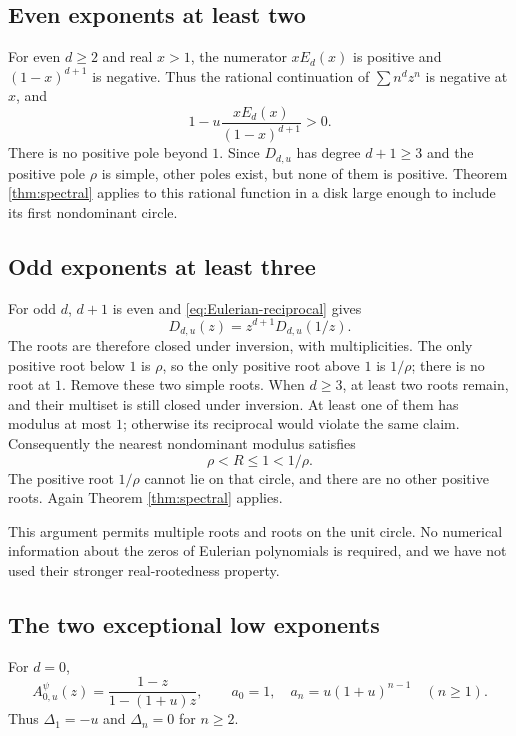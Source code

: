 \documentclass[11pt,letterpaper]{article}
\theoremstyle{definition}
\newcommand{\Delt}{\Delta}
\numberwithin{equation}{section}
\begin{document}
\subsection{Even exponents at least two}

For even $d\ge2$ and real $x>1$, the numerator $xE_d(x)$ is positive
and $(1-x)^{d+1}$ is negative. Thus the rational continuation of
$\sum n^d z^n$ is negative at $x$, and
\[
1-u\frac{xE_d(x)}{(1-x)^{d+1}}>0.
\]
There is no positive pole beyond $1$. Since $D_{d,u}$ has degree
$d+1\ge3$ and the positive pole $\rho$ is simple, other poles exist,
but none of them is positive. Theorem \ref{thm:spectral} applies to this
rational function in a disk large enough to include its first
nondominant circle.

\subsection{Odd exponents at least three}

For odd $d$, $d+1$ is even and \eqref{eq:Eulerian-reciprocal} gives
\begin{equation}\label{eq:D-reciprocal}
D_{d,u}(z)=z^{d+1}D_{d,u}(1/z).
\end{equation}
The roots are therefore closed under inversion, with multiplicities.
The only positive root below $1$ is $\rho$, so the only positive root
above $1$ is $1/\rho$; there is no root at $1$.
Remove these two simple roots. When $d\ge3$, at least two roots remain,
and their multiset is still closed under inversion. At least one of them
has modulus at most $1$; otherwise its reciprocal would violate the same
claim. Consequently the nearest nondominant modulus satisfies
\[
\rho<R\le1<1/\rho.
\]
The positive root $1/\rho$ cannot lie on that circle, and there are no
other positive roots. Again Theorem \ref{thm:spectral} applies.

This argument permits multiple roots and roots on the unit circle.
No numerical information about the zeros of Eulerian polynomials is
required, and we have not used their stronger real-rootedness property.

\subsection{The two exceptional low exponents}

For $d=0$,
\[
A^\psi_{0,u}(z)=\frac{1-z}{1-(1+u)z},\qquad
a_0=1,\quad a_n=u(1+u)^{n-1}\quad(n\ge1).
\]
Thus $\Delt_1=-u$ and $\Delt_n=0$ for $n\ge2$.
\end{document}

